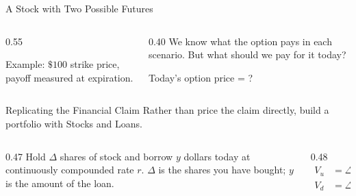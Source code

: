 \documentclass[aspectratio=169,10pt]{beamer}
\begin{document}
\begin{frame}{A Stock with Two Possible Futures}
  \begin{columns}[c,onlytextwidth]
    \begin{column}{0.55\textwidth}
      \centering
      \vspace{0.15cm}

      \scriptsize Example: $\$100$ strike price, payoff measured at expiration.
    \end{column}
    \begin{column}{0.40\textwidth}
      We know what the option pays in each scenario. But what should we pay for it today?
      \vspace{0.7cm}

      \begin{center}
        \Large Today's option price = ?
      \end{center}
    \end{column}
  \end{columns}
\end{frame}

\begin{frame}{Replicating the Financial Claim}
  Rather than price the claim directly, build a portfolio with Stocks and Loans.
  \vspace{0.3cm}
  \begin{columns}[T,onlytextwidth]
    \begin{column}{0.47\textwidth}
      Hold $\Delta$ shares of stock and borrow $y$ dollars today at continuously compounded rate $r$.
      \vspace{0.2cm}
      \small
      $\Delta$ is the shares you have bought; $y$ is the amount of the loan.
    \end{column}
    \begin{column}{0.48\textwidth}
      \begin{align*}
        V_u &= \Delta S_u - y e^{rT},\\
        V_d &= \Delta S_d - y e^{rT}.
      \end{align*}
    \end{column}
  \end{columns}
\end{frame}
\end{document}
